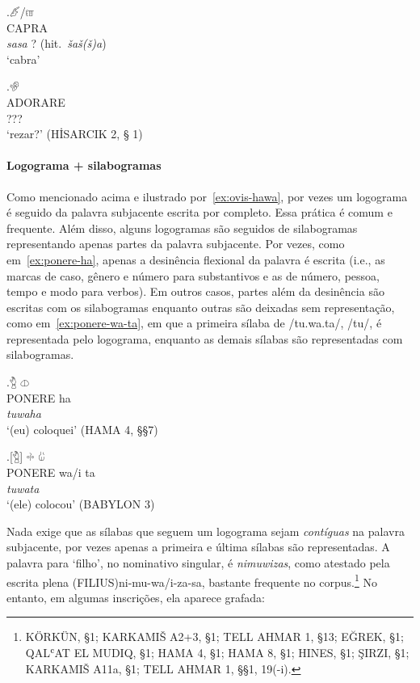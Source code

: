 \exg.\label{ex:capra}\Large 𔑶\slash{}𔑷\\
CAPRA\\
\emph{sasa}{ }? (hit.\ \emph{šaš{(š)}a})\\
`cabra'


\exg.\label{ex:adorare}\Large 𔐅  \\
ADORARE\\
???\\
`rezar?' (HİSARCIK 2, § 1)

\paragraph{Logograma + silabogramas}
Como mencionado acima e ilustrado por~\ref{ex:ovis-hawa}, por vezes um logograma
é seguido da palavra subjacente escrita por completo. Essa prática é comum e
frequente.
Além disso, alguns logogramas são seguidos de silabogramas representando apenas
partes da palavra subjacente.
Por vezes, como em~\ref{ex:ponere-ha}, apenas a desinência flexional da
palavra é escrita (i.e., as marcas de caso, gênero e número para substantivos e
as de número, pessoa, tempo e modo para verbos).
Em outros casos, partes além da desinência são escritas com os silabogramas
enquanto outras são deixadas sem representação, como em~\ref{ex:ponere-wa-ta},
em que a primeira sílaba de /tu.wa.ta/, /tu/, é representada pelo logograma,
enquanto as demais sílabas são representadas com silabogramas.

\exg.\label{ex:ponere-ha}\Large 𔑇 \Large 𔓷\\
PONERE ha\\
\emph{tuwaha}\\
`(eu) coloquei' (HAMA 4, §§7)

\exg.\label{ex:ponere-wa-ta}\Large [𔑇] \Large 𔗬 \Large 𔑰\\
PONERE wa/i ta\\
\emph{tuwata}\\
`(ele) colocou' (BABYLON 3)


\noindent Nada exige que as sílabas que seguem um logograma sejam
\emph{contíguas} na palavra subjacente, por vezes apenas a primeira e última
sílabas são representadas.
A palavra para `filho', no nominativo singular, é \emph{nimuwizas}, como
atestado pela escrita plena {(FILIUS)}ni-mu-wa/i-za-sa, bastante frequente no
corpus.\footnote{KÖRKÜN, §1; KARKAMIŠ A2+3, §1; TELL AHMAR 1, §13; EĞREK, §1;
	QAL\textsc{ʿ}AT EL MUDIQ, §1; HAMA 4, §1; HAMA 8, §1; HINES, §1; ŞIRZI, §1;
	KARKAMIŠ A11a, §1; TELL AHMAR 1, §§1, 19(-i).}
No entanto, em algumas inscrições, ela aparece grafada:

